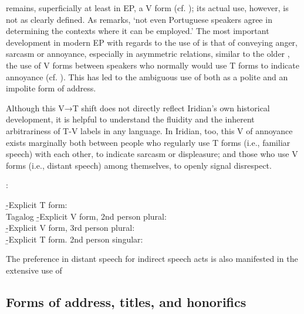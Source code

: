 {{				 remains, superficially at least in
				EP, a V form (cf. \cite[85]{ganhoport}); its
				actual use, however, is not as clearly defined. As
				\textcite{laraport} remarks, `not even Portuguese speakers agree
				in determining the contexts where it can be employed.' The most
				important development in modern EP with
				regards to the use of  is that of conveying
				anger, sarcasm or annoyance, especially in asymmetric relations,
				similar to the older , the use of V forms between
				speakers who normally would use T forms to indicate annoyance
				(cf. \cite{hummelport}). This has led to the ambiguous use of
				 both as a polite and an impolite form of address.

				Although this V→T shift does not directly reflect Iridian's own
			historical development, it is helpful to understand the fluidity and
			the inherent arbitrariness of T-V labels in any language. In
			Iridian, too, this V of annoyance exists marginally both between
			people who regularly use T forms (i.e., familiar speech) with each
			other, to indicate sarcasm or displeasure; and those who use V forms
			(i.e., distant speech) among themselves, to openly signal
			disrespect. }:\\
				 }
			\b{-}{Explicit T form:\\
				 }
		\endsubsub
	\a Tagalog
		\beginsubsub
			\b{-}{Explicit V form, 2nd person plural:\\
				 }
			\b{-}{Explicit V form, 3rd person plural:\\
				 }
			\b{-}{Explicit T form. 2nd person singular:\\
				 }
		\endsubsub
\xe

The preference in distant speech for indirect speech acts is also manifested in
the extensive use of 

\subsection{Forms of address, titles, and honorifics}

